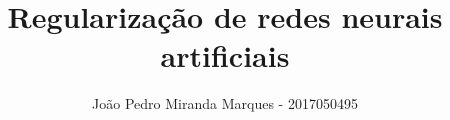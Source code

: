 \documentclass[10pt]{article}
\title{\LARGE \bf
Regularização de redes neurais artificiais 
}
\author{João Pedro Miranda Marques - 2017050495}
\begin{document}
\maketitle
\begin{multicols}{2}















\end{multicols}
\pagebreak
\printbibliography
\end{document}
